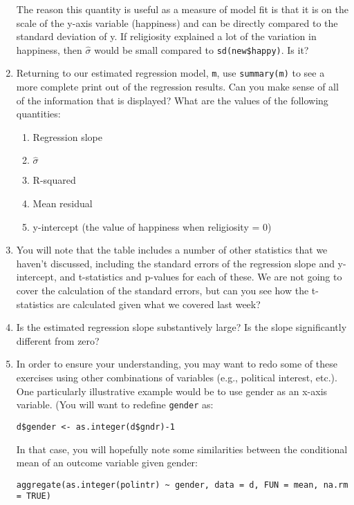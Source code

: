 \documentclass[a4paper,12pt]{article}
\begin{document}
\begin{enumerate}
\noindent The reason this quantity is useful as a measure of model fit is that it is on the scale of the y-axis variable (happiness) and can be directly compared to the standard deviation of y. If religiosity explained a lot of the variation in happiness, then $\hat{\sigma}$ would be small compared to \texttt{sd(new\$happy)}. Is it?

\item Returning to our estimated regression model, \texttt{m}, use \texttt{summary(m)} to see a more complete print out of the regression results. Can you make sense of all of the information that is displayed? What are the values of the following quantities:

\begin{enumerate}
\item Regression slope
\item $\hat{\sigma}$
\item R-squared
\item Mean residual
\item y-intercept (the value of happiness when religiosity = 0)
\end{enumerate}

\item You will note that the table includes a number of other statistics that we haven't discussed, including the standard errors of the regression slope and y-intercept, and t-statistics and p-values for each of these. We are not going to cover the calculation of the standard errors, but can you see how the t-statistics are calculated given what we covered last week?

\item Is the estimated regression slope substantively large? Is the slope significantly different from zero?

\item In order to ensure your understanding, you may want to redo some of these exercises using other combinations of variables (e.g., political interest, etc.). One particularly illustrative example would be to use gender as an x-axis variable. (You will want to redefine \texttt{gender} as:

\begin{verbatim}
d$gender <- as.integer(d$gndr)-1
\end{verbatim}

\noindent In that case, you will hopefully note some similarities between the conditional mean of an outcome variable given gender:

\begin{verbatim}
aggregate(as.integer(polintr) ~ gender, data = d, FUN = mean, na.rm = TRUE)
\end{verbatim}


\end{enumerate}
\end{document}
